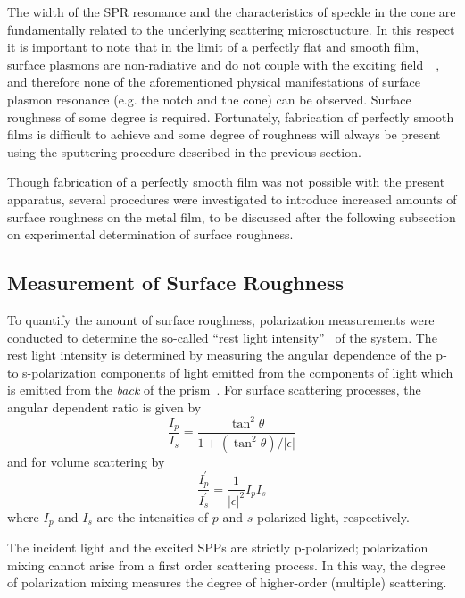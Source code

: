 The width of the SPR resonance and the characteristics of speckle in the
cone are fundamentally related to the underlying scattering microsctucture.
In this respect it is important to note that in the limit of a perfectly
flat and smooth film, surface plasmons are non-radiative and do not couple
with the exciting
field~\cite{johansson1990theory}~\cite{otto1968excitation}, and therefore
none of the aforementioned physical manifestations of surface plasmon
resonance (e.g. the notch and the cone) can be observed.  Surface roughness
of some degree is required.  Fortunately, fabrication of perfectly smooth
films is difficult to achieve and some degree of roughness will always be
present using the sputtering procedure described in the previous section.

Though fabrication of a perfectly smooth film was not possible with the
present apparatus, several procedures were investigated to introduce
increased amounts of surface roughness on the metal film, to be discussed
after the following subsection on experimental determination of surface
roughness.

\subsection{Measurement of Surface Roughness}
To quantify the amount of surface roughness, polarization measurements were
conducted to determine the so-called ``rest light
intensity''~\cite{horstmann1977multiple} of the system.  The rest light
intensity is determined by measuring the angular dependence of the p- to
s-polarization components of light emitted from the components of light
which is emitted from the \textit{back} of the
prism~\cite{kretschmann1972decay}.  For surface scattering processes, the
angular dependent ratio is given by~\cite{kretschmann1972thesis}
\begin{equation}
\frac{I_p}{I_s} = \frac{\tan^2\theta}{1+(\tan^2\theta)/|\epsilon|}
\label{eqn:ipssurface}
\end{equation}
and for volume scattering by
\begin{equation}
\frac{I^\prime_p}{I^\prime_s} = \frac{1}{|\epsilon|^2} I_p I_s
\label{eqn:ipsvolume}
\end{equation}
where $I_p$ and $I_s$ are the intensities of $p$ and $s$ polarized light,
respectively.

The incident light and the excited SPPs are strictly p-polarized;
polarization mixing cannot arise from a first order scattering process.
In this way, the degree of polarization mixing measures the degree of
higher-order (multiple) scattering.

